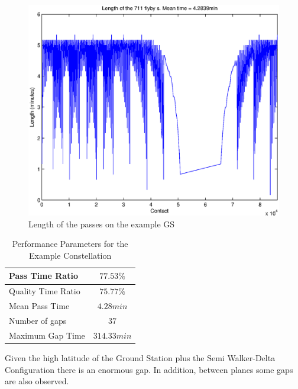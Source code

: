 \begin{figure}[H]
\begin{center}
\includegraphics[scale=0.65]{LengthPass}
\caption{Length of the passes on the example GS}
\end{center}
\end{figure}

\begin{table}[H]
\centering
\begin{tabular}{|l|c|}
\hline
Pass Time Ratio & $77.53\% $ \\ \hline
Quality Time Ratio     & $ 75.77\% $   \\ \hline
Mean Pass Time   & $ 4.28 min $ \\ \hline
Number of gaps  	 & $37$   \\ \hline
Maximum Gap Time   & $ 314.33 min $   \\ \hline
\end{tabular}
\caption{Performance Parameters for the Example Constellation}
\end{table}

Given the high latitude of the Ground Station plus the Semi Walker-Delta Configuration there is an enormous gap. In addition, between planes some gaps are also observed.